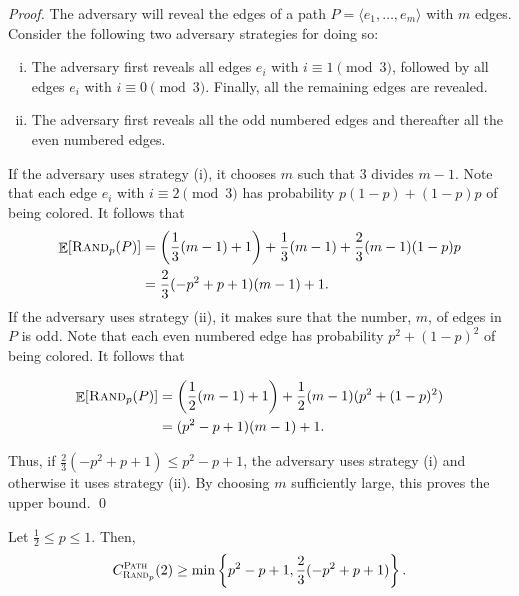 \documentclass[smallextended]{svjour3}
\def\paths{\text{\sc Path}\xspace}
\newcommand{\RP}{\ensuremath{\operatorname{\textsc{Rand}}}\xspace}
\DeclareMathOperator{\E}{\mathbb{E}}
\begin{document}
\begin{proof}
The adversary will reveal the edges of a path $P=\langle e_1,\ldots , e_m\rangle$ with $m$ edges. Consider the following two adversary strategies for doing so:
\begin{enumerate}[(i)]
\item The adversary first reveals all edges $e_i$ with $i\equiv 1\pmod{3}$, followed by all edges $e_i$ with $i\equiv 0\pmod{3}$. Finally, all the remaining edges are revealed.

\item The adversary first reveals all the odd numbered edges and thereafter all the even numbered edges.
\end{enumerate}

If the adversary uses strategy (i), it chooses $m$ such that $3$ divides $m-1$. Note that each edge $e_i$ with $i\equiv 2\pmod{3}$ has probability $p(1-p)+(1-p)p$ of being colored. It follows that 
\begin{align*}
\E[\RP_p(P)]
&=\left(\frac{1}{3}(m-1)+1\right) + \frac{1}{3}(m-1)+\frac{2}{3}(m-1)(1-p)p\\
&=\frac23(-p^2+p+1)(m-1)+1.
\end{align*}
If the adversary uses strategy (ii), it makes sure that the number, $m$, of edges in $P$ is odd. Note that each even numbered edge has probability $p^2+(1-p)^2$ of being colored. It follows that 

\begin{align*}
\E[\RP_p(P)]&=\left(\frac{1}{2}(m-1)+1\right)+\frac{1}{2}(m-1)(p^2+(1-p)^2)\\ 
&= (p^2-p+1)(m-1)+1.
\end{align*}

Thus, if $\frac23 (-p^2+p+1)\leq p^2-p+1$, the adversary uses strategy (i) and otherwise it uses strategy (ii). By choosing $m$ sufficiently large, this proves the upper bound.
\qed\end{proof}

\begin{lemma}
\label{rplower}
Let $\frac12 \leq p\leq 1$. Then,
\begin{displaymath}
  C_{\RP_p}^{\text{\paths}}(2) \geq \min\left\{p^2-p+1, \frac{2}{3}(-p^2+p+1)\right\}.
\end{displaymath}
\end{lemma}
\end{document}
